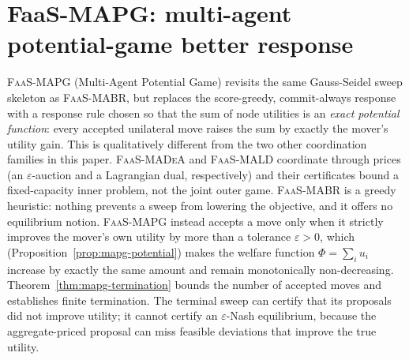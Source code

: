 
\section{FaaS-MAPG: multi-agent potential-game better response}
\label{sec:mapg}

\textsc{FaaS-MAPG} (Multi-Agent Potential Game) revisits the same
Gauss-Seidel sweep skeleton as \textsc{FaaS-MABR}, but replaces the
score-greedy, commit-always response with a response rule chosen so that the
sum of node utilities is an \emph{exact potential function}: every accepted
unilateral move raises the sum by exactly the mover's utility gain. This is
qualitatively different from the two other coordination families in this
paper. \textsc{FaaS-MADeA} and \textsc{FaaS-MALD} coordinate through prices
(an $\varepsilon$-auction and a Lagrangian dual, respectively) and their
certificates bound a fixed-capacity inner problem, not the joint outer game.
\textsc{FaaS-MABR} is a greedy heuristic: nothing prevents a sweep from
lowering the objective, and it offers no equilibrium notion. \textsc{FaaS-MAPG}
instead accepts a move only when it strictly improves the mover's own utility
by more than a tolerance $\varepsilon>0$, which (Proposition~\ref{prop:mapg-potential})
makes the welfare function $\Phi=\sum_i u_i$ increase by exactly the same
amount and remain monotonically non-decreasing. Theorem~\ref{thm:mapg-termination}
bounds the number of accepted moves and establishes finite termination.
The terminal sweep can certify that its proposals did not improve utility;
it cannot certify an $\varepsilon$-Nash equilibrium, because the aggregate-priced
proposal can miss feasible deviations that improve the true utility.

